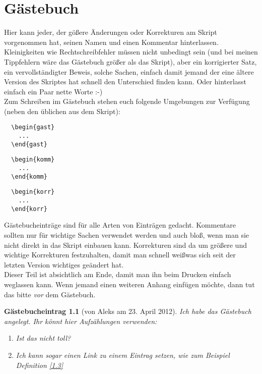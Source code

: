\documentclass[a4paper,12pt]{report}
\theoremstyle{break}
\theoremstyle{nonumberbreak}
\newtheorem{gast}{G\"astebucheintrag}
\newtheorem{komm}{Kommentar}
\newtheorem{korr}{Korrktur}
\theoremstyle{nonumberplain}
\begin{document}


\chapter{G\"astebuch}
Hier kann jeder, der g\"o\ss ere \"Anderungen oder Korrekturen am Skript vorgenommen hat, seinen Namen und einen Kommentar hinterlassen. Kleinigkeiten wie Rechtschreibfehler m\"ussen nicht unbedingt sein (und bei meinen Tippfehlern w\"are das G\"astebuch gr\"o\ss er als das Skript), aber ein korrigierter Satz, ein vervollst\"andigter Beweis, solche Sachen, einfach damit jemand der eine \"altere Version des Skriptes hat schnell den Unterschied finden kann. Oder hinterlasst einfach ein Paar nette Worte :-)\\
Zum Schreiben im G\"astebuch stehen euch folgende Umgebungen zur Verf\"ugung (neben den \"ublichen aus dem Skript):
\begin{center}\begin{minipage}{0.3\textwidth}\begin{verbatim}
  \begin{gast}
    ...
  \end{gast}
\end{verbatim}\end{minipage}
\begin{minipage}{0.3\textwidth}\begin{verbatim}  
  \begin{komm}
    ...  
  \end{komm}
\end{verbatim}\end{minipage}
\begin{minipage}{0.3\textwidth}\begin{verbatim}  
  \begin{korr}
    ...  
  \end{korr}
\end{verbatim}\end{minipage}\end{center}
G\"astebucheintr\"age sind f\"ur alle Arten von Eintr\"agen gedacht. Kommentare sollten nur f\"ur wichtige Sachen verwendet werden und auch blo\ss,  wenn man sie nicht direkt in das Skript einbauen kann. Korrekturen sind da um gr\"o\ss ere und wichtige Korrekturen festzuhalten, damit man schnell wei\ss was sich seit der letzten Version wichtiges ge\"andert hat.\\
Dieser Teil ist absichtlich am Ende, damit man ihn beim Drucken einfach weglassen kann. Wenn jemand einen weiteren Anhang einf\"ugen m\"ochte, dann tut das bitte \emph{vor} dem G\"astebuch.\\

\begin{gast}[von Aleks am 23. April 2012]
Ich habe das G\"astebuch angelegt. Ihr k\"onnt hier Aufz\"ahlungen verwenden:
\begin{enumerate}[1)]
\item
  Ist das nicht toll?
\item
  Ich kann sogar einen Link zu einem Eintrag setzen, wie zum Beispiel Definition \ref{1.3}
\end{enumerate}
\end{gast}
\end{document}
